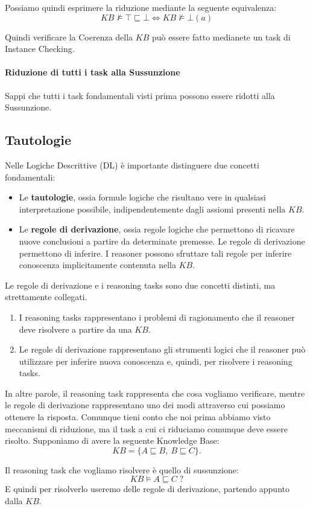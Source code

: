 Possiamo quindi esprimere la riduzione mediante la
seguente equivalenza:
\[
    \boxed{
        KB \not\models \top \sqsubseteq \bot
        \iff
        KB \not\models \bot(a)
    }
\]

Quindi verificare la Coerenza della $KB$ può essere fatto medianete un task di Instance Checking.

\paragraph{Riduzione di tutti i task alla Sussunzione}
Sappi che tutti i task fondamentali visti prima possono essere ridotti alla Sussunzione.

\newpage
\subsection{Tautologie}
Nelle Logiche Descrittive (DL) è importante distinguere due
concetti fondamentali:
\begin{itemize}
    \item Le \textbf{tautologie}, ossia formule logiche che
    risultano vere in qualsiasi interpretazione possibile,
    indipendentemente dagli assiomi presenti nella $KB$.

    \item Le \textbf{regole di derivazione}, ossia regole logiche
    che permettono di ricavare nuove conclusioni a partire da
    determinate premesse.
    Le regole di derivazione permettono di inferire.
    I reasoner possono sfruttare tali regole per inferire
    conoscenza implicitamente contenuta nella $KB$.
\end{itemize}

\begin{observation}{}
    Le regole di derivazione e i reasoning tasks sono due concetti distinti, ma strettamente collegati.
    \begin{enumerate}
        \item I reasoning tasks rappresentano i problemi di ragionamento che il reasoner deve risolvere a partire da una \(KB\).
        \item Le regole di derivazione rappresentano gli strumenti logici che il reasoner può utilizzare per inferire nuova conoscenza e, quindi, per risolvere i reasoning tasks.
    \end{enumerate}
    In altre parole, il reasoning task rappresenta che cosa vogliamo verificare, mentre le regole di derivazione rappresentano uno dei modi attraverso cui possiamo ottenere la risposta.
    Comunque tieni conto che noi prima abbiamo visto meccanismi di riduzione, ma il task a cui ci riduciamo comunque deve essere risolto.
    Supponiamo di avere la seguente Knowledge Base:
    \[
    KB=\{A\sqsubseteq B,\ B\sqsubseteq C\}.
    \]

    Il reasoning task che vogliamo risolvere è quello di sussunzione:
    \[
    KB\models A\sqsubseteq C\;?
    \]
    E quindi per risolverlo useremo delle regole di derivazione, partendo appunto dalla $KB$.
\end{observation}

